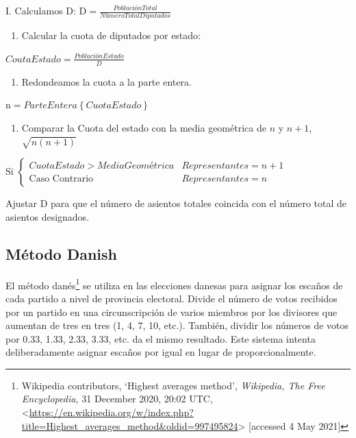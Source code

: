\documentclass[12pt,a4paper,]{book}
\providecommand{\tightlist}{%
  \setlength{\itemsep}{0pt}\setlength{\parskip}{0pt}}
\let\rmarkdownfootnote\footnote%
\def\footnote{\protect\rmarkdownfootnote}
\numberwithin{dummy}{section}
\theoremstyle{ocrenumbox}
\theoremstyle{blacknumex}
\theoremstyle{blacknumbox}
\theoremstyle{ocrenum}
\theoremstyle{ocrenum}
\begin{document}
I. Calculamos D:
\(\textrm{D} = \frac{Población Total}{NúmeroTotalDiputados}\)

\begin{enumerate}
\def\labelenumi{\Roman{enumi}.}
\setcounter{enumi}{1}
\tightlist
\item
  Calcular la cuota de diputados por estado:
\end{enumerate}

\(CoutaEstado = \frac{Población Estado}{D}\)

\begin{enumerate}
\def\labelenumi{\Roman{enumi}.}
\setcounter{enumi}{2}
\tightlist
\item
  Redondeamos la cuota a la parte entera.
\end{enumerate}

\(\textrm{n} = ParteEntera\left\{{Cuota Estado}\right\}\)

\begin{enumerate}
\def\labelenumi{\Roman{enumi}.}
\setcounter{enumi}{3}
\tightlist
\item
  Comparar la Cuota del estado con la media geométrica de \(n\) y
  \(n+1\), \(\sqrt{n(n+1)}\)
\end{enumerate}

Si
\(\begin{cases}CuotaEstado>MediaGeométrica & Representantes = n+1\\\textrm{Caso Contrario} & Representantes = n\end{cases}\)

Ajustar D para que el número de asientos totales coincida con el número
total de asientos designados.

\hypertarget{muxe9todo-danish}{%
\subsection{Método Danish}\label{muxe9todo-danish}}

El método danés\footnote{Wikipedia contributors, `Highest averages
  method', \emph{Wikipedia, The Free Encyclopedia,} 31 December 2020,
  20:02 UTC,
  \textless{}\url{https://en.wikipedia.org/w/index.php?title=Highest_averages_method\&oldid=997495824}\textgreater{}
  {[}accessed 4 May 2021{]}} se utiliza en las elecciones danesas para
asignar los escaños de cada partido a nivel de provincia electoral.
Divide el número de votos recibidos por un partido en una
circunscripción de varios miembros por los divisores que aumentan de
tres en tres (1, 4, 7, 10, etc.). También, dividir los números de votos
por 0.33, 1.33, 2.33, 3.33, etc. da el mismo resultado. Este sistema
intenta deliberadamente asignar escaños por igual en lugar de
proporcionalmente.
\end{document}
